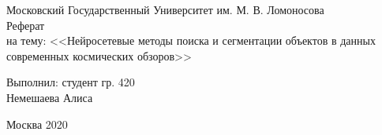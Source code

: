 \begin{center} 

\large Московский Государственный Университет им. М. В. Ломоносова\\[5.5cm] 

\huge Реферат \\[0.6cm] %
\large на тему:  <<Нейросетевые методы поиска и сегментации объектов в данных современных космических обзоров>>\\[3.7cm]


\end{center} 

\begin{flushright}
Выполнил: студент гр. 420 \\
Немешаева Алиса \\
\end{flushright}


\vfill 

\begin{center} 
\large Москва 2020
\end{center} 

\thispagestyle{empty}
